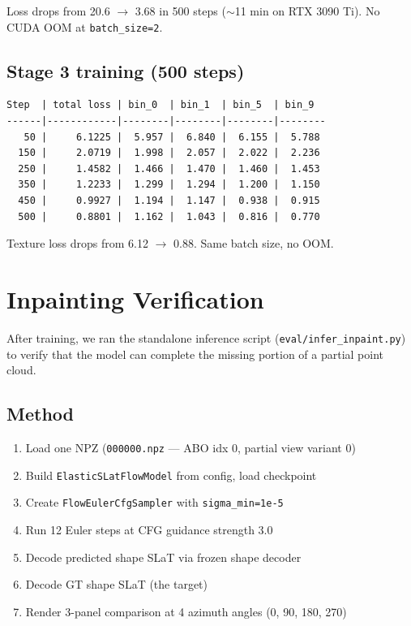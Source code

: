 Loss drops from 20.6 $\rightarrow$ 3.68 in 500 steps ($\sim$11 min on RTX 3090 Ti).
No CUDA OOM at \texttt{batch\_size=2}.

\subsection{Stage 3 training (500 steps)}

\begin{lstlisting}
Step  | total loss | bin_0  | bin_1  | bin_5  | bin_9
------|------------|--------|--------|--------|--------
   50 |     6.1225 |  5.957 |  6.840 |  6.155 |  5.788
  150 |     2.0719 |  1.998 |  2.057 |  2.022 |  2.236
  250 |     1.4582 |  1.466 |  1.470 |  1.460 |  1.453
  350 |     1.2233 |  1.299 |  1.294 |  1.200 |  1.150
  450 |     0.9927 |  1.194 |  1.147 |  0.938 |  0.915
  500 |     0.8801 |  1.162 |  1.043 |  0.816 |  0.770
\end{lstlisting}

Texture loss drops from 6.12 $\rightarrow$ 0.88. Same batch size, no OOM.

\section{Inpainting Verification}

After training, we ran the standalone inference script
(\texttt{eval/infer\_inpaint.py}) to verify that the model can complete the missing
portion of a partial point cloud.

\subsection{Method}

\begin{enumerate}
  \item Load one NPZ (\texttt{000000.npz} --- ABO idx 0, partial view variant 0)
  \item Build \texttt{ElasticSLatFlowModel} from config, load checkpoint
  \item Create \texttt{FlowEulerCfgSampler} with \texttt{sigma\_min=1e-5}
  \item Run 12 Euler steps at CFG guidance strength 3.0
  \item Decode predicted shape SLaT via frozen shape decoder
  \item Decode GT shape SLaT (the target)
  \item Render 3-panel comparison at 4 azimuth angles (0\degree, 90\degree, 180\degree, 270\degree)
\end{enumerate}

